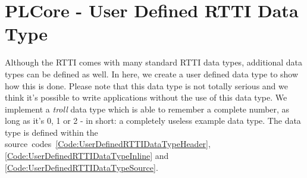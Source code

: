 \chapter{PLCore - User Defined \ac{RTTI} Data Type}
\label{Appendix:UserDefinedRTTIDataType}
Although the \ac{RTTI} comes with many standard \ac{RTTI} data types, additional data types can be defined as well. In here, we create a user defined data type to show how this is done. Please note that this data type is not totally serious and we think it's possible to write applications without the use of this data type. We implement a \emph{troll} data type which is able to remember a complete number, as long as it's 0, 1 or 2 - in short: a completely useless example data type. The data type is defined within the source~codes~\ref{Code:UserDefinedRTTIDataTypeHeader}, \ref{Code:UserDefinedRTTIDataTypeInline} and \ref{Code:UserDefinedRTTIDataTypeSource}.

